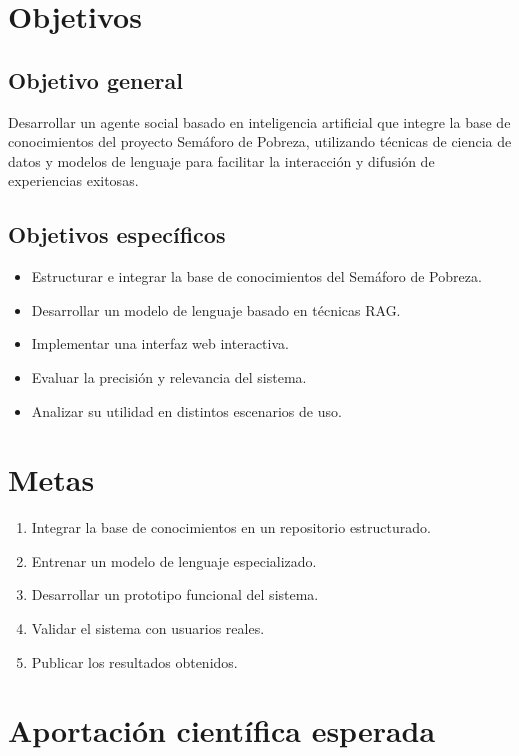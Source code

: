 \documentclass{article}
\begin{document}
\section{Objetivos}

\subsection{Objetivo general}

Desarrollar un agente social basado en inteligencia artificial que integre la base de conocimientos del proyecto Semáforo de Pobreza, utilizando técnicas de ciencia de datos y modelos de lenguaje para facilitar la interacción y difusión de experiencias exitosas.

\subsection{Objetivos específicos}

\begin{itemize}
\item Estructurar e integrar la base de conocimientos del Semáforo de Pobreza.
\item Desarrollar un modelo de lenguaje basado en técnicas RAG.
\item Implementar una interfaz web interactiva.
\item Evaluar la precisión y relevancia del sistema.
\item Analizar su utilidad en distintos escenarios de uso.
\end{itemize}

\section{Metas}

\begin{enumerate}
\item Integrar la base de conocimientos en un repositorio estructurado.
\item Entrenar un modelo de lenguaje especializado.
\item Desarrollar un prototipo funcional del sistema.
\item Validar el sistema con usuarios reales.
\item Publicar los resultados obtenidos.
\end{enumerate}
\section{Aportación científica esperada}
\end{document}
